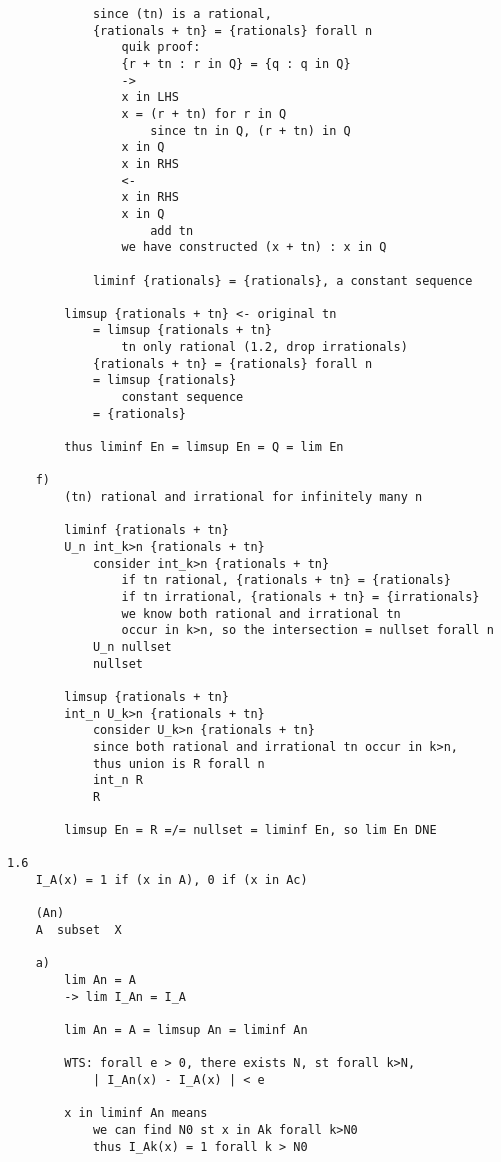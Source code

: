 \documentclass{article}
\begin{document}
\begin{flushleft}
\begin{verbatim}
            since (tn) is a rational, 
            {rationals + tn} = {rationals} forall n
                quik proof:
                {r + tn : r in Q} = {q : q in Q}
                ->
                x in LHS
                x = (r + tn) for r in Q 
                    since tn in Q, (r + tn) in Q
                x in Q 
                x in RHS 
                <- 
                x in RHS 
                x in Q 
                    add tn 
                we have constructed (x + tn) : x in Q

            liminf {rationals} = {rationals}, a constant sequence 

        limsup {rationals + tn} <- original tn
            = limsup {rationals + tn}
                tn only rational (1.2, drop irrationals)
            {rationals + tn} = {rationals} forall n
            = limsup {rationals}
                constant sequence 
            = {rationals} 

        thus liminf En = limsup En = Q = lim En 
    
    f)
        (tn) rational and irrational for infinitely many n 

        liminf {rationals + tn}
        U_n int_k>n {rationals + tn}
            consider int_k>n {rationals + tn} 
                if tn rational, {rationals + tn} = {rationals}
                if tn irrational, {rationals + tn} = {irrationals}
                we know both rational and irrational tn 
                occur in k>n, so the intersection = nullset forall n
            U_n nullset 
            nullset 

        limsup {rationals + tn}
        int_n U_k>n {rationals + tn}
            consider U_k>n {rationals + tn}
            since both rational and irrational tn occur in k>n,
            thus union is R forall n 
            int_n R 
            R 

        limsup En = R =/= nullset = liminf En, so lim En DNE 

1.6
    I_A(x) = 1 if (x in A), 0 if (x in Ac)

    (An)
    A  subset  X 

    a)
        lim An = A 
        -> lim I_An = I_A 

        lim An = A = limsup An = liminf An 

        WTS: forall e > 0, there exists N, st forall k>N, 
            | I_An(x) - I_A(x) | < e 

        x in liminf An means 
            we can find N0 st x in Ak forall k>N0 
            thus I_Ak(x) = 1 forall k > N0 


\end{verbatim}
\end{flushleft}
\end{document}
